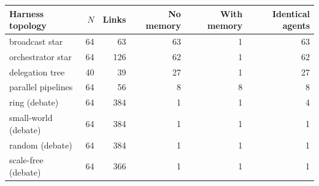 \begin{tabular}{lrrrrr}
\toprule
Harness topology & $N$ & Links & No memory & With memory & Identical agents \\
\midrule
broadcast star & 64 & 63 & 63 & 1 & 63 \\
orchestrator star & 64 & 126 & 62 & 1 & 62 \\
delegation tree & 40 & 39 & 27 & 1 & 27 \\
parallel pipelines & 64 & 56 & 8 & 8 & 8 \\
ring (debate) & 64 & 384 & 1 & 1 & 4 \\
small-world (debate) & 64 & 384 & 1 & 1 & 1 \\
random (debate) & 64 & 384 & 1 & 1 & 1 \\
scale-free (debate) & 64 & 366 & 1 & 1 & 1 \\
\bottomrule
\end{tabular}
